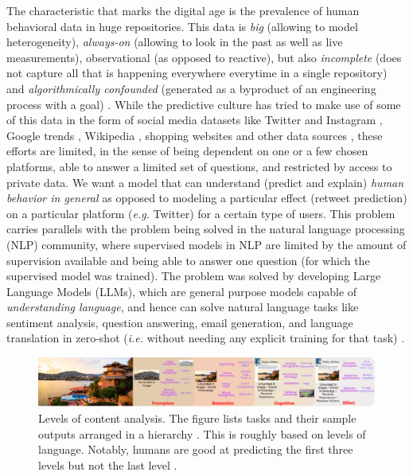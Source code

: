 The characteristic that marks the digital age is the prevalence of human behavioral data in huge repositories. This data is \textit{big} (allowing to model heterogeneity), \textit{always-on} (allowing to look in the past as well as live measurements), observational (as opposed to reactive), but also \textit{incomplete} (does not capture all that is happening everywhere everytime in a single repository) and \textit{algorithmically confounded} (generated as a byproduct of an engineering process with a goal) \cite{salganik2019bit}. While the predictive culture has tried to make use of some of this data in the form of social media datasets like Twitter \cite{tumasjan2010predicting,asur2010predicting} and Instagram \cite{kim2020multimodal}, Google trends \cite{choi2012predicting,carriere2013nowcasting}, Wikipedia \cite{generous2014global,de2021general,mestyan2013early}, shopping websites \cite{krumme2013predictability,de2015unique} and other data sources \cite{brockmann2006scaling,song2010limits,miritello2013limited}, these efforts are limited, in the sense of being dependent on one or a few chosen platforms, able to answer a limited set of questions, and restricted by access to private data. We want a model that can understand (predict and explain) \textit{human behavior in general} as opposed to modeling a particular effect (retweet prediction) on a particular platform (\textit{e.g.} Twitter) for a certain type of users.
This problem carries parallels with the problem being solved in the natural language processing (NLP) community, where supervised models in NLP are limited by the amount of supervision available and being able to answer one question (for which the supervised model was trained). The problem was solved by developing Large Language Models (LLMs), which are general purpose models capable of \textit{understanding language}, and hence can solve natural language tasks like sentiment analysis, question answering, email generation, and language translation in zero-shot (\textit{i.e.} without needing any explicit training for that task) \cite{devlin2018bert,brown2020language,radford2018improving,raffel2020exploring,radford2019language}.




\begin{figure}[h]
  \centering
  \includegraphics[width=1.0\textwidth]{images/levels of analysis.pdf}
  \caption{Levels of content analysis. The figure lists tasks and their sample outputs arranged in a hierarchy \cite{shannon-weaver-1949}. This is roughly based on levels of language. Notably, humans are good at predicting the first three levels but not the last level \cite{tetlock2017expert,forecasting2023insights,tan2014effect,isola2013makes}. 
  \label{fig:levels of content analysis}
  }
\end{figure}



